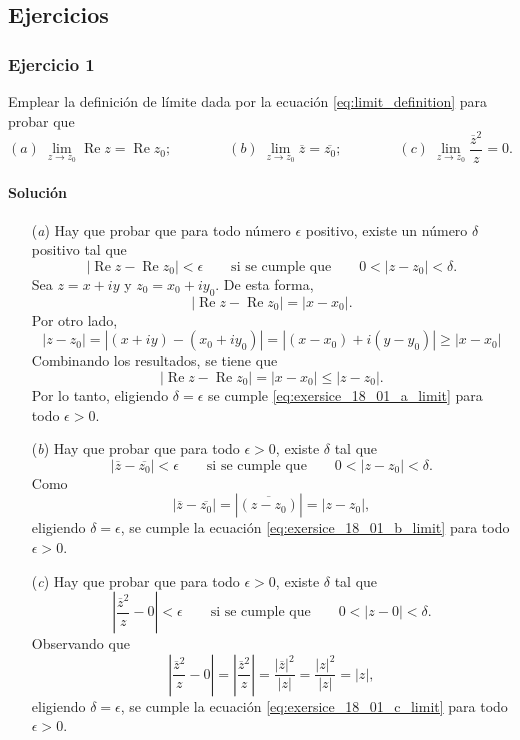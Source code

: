 \documentclass[a4paper]{report}
\renewcommand{\Re}{\operatorname{Re}}
\begin{document}
\subsection*{Ejercicios}

\subsubsection{Ejercicio 1}

Emplear la definición de límite dada por la ecuación \ref{eq:limit_definition} para probar que 
\[
 (\textit{a})\;\lim_{z\to z_0}\Re z=\Re z_0;\qquad\qquad 
 (\textit{b})\;\lim_{z\to z_0}\overline{z}=\overline{z_0};\qquad\qquad
 (\textit{c})\;\lim_{z\to z_0}\frac{\overline{z}^2}{z}=0.
\]

\paragraph{Solución} 
\begin{enumerate}
 \item[(\textit{a})] Hay que probar que para todo número \(\epsilon\) positivo, existe un número \(\delta\) positivo tal que 
\begin{equation}\label{eq:exersice_18_01_a_limit}
 |\Re z-\Re z_0|<\epsilon
 \qquad\textrm{si se cumple que}\qquad
 0<|z-z_0|<\delta.
\end{equation}
Sea \(z=x+iy\) y \(z_0=x_0+iy_0\). De esta forma,
\[
 |\Re z-\Re z_0|=|x-x_0|.
\]
Por otro lado,
\[
 |z-z_0|=|(x+iy)-(x_0+iy_0)|=|(x-x_0)+i(y-y_0)|\geq|x-x_0|
\]
Combinando los resultados, se tiene que 
\[
 |\Re z-\Re z_0|=|x-x_0|\leq|z-z_0|.
\]
Por lo tanto, eligiendo \(\delta=\epsilon\) se cumple \ref{eq:exersice_18_01_a_limit} para todo \(\epsilon>0\).
\item[(\textit{b})] Hay que probar que para todo \(\epsilon>0\), existe \(\delta\) tal que
\begin{equation}\label{eq:exersice_18_01_b_limit}
 |\overline{z}-\overline{z_0}|<\epsilon
 \qquad\textrm{si se cumple que}\qquad
 0<|z-z_0|<\delta.
\end{equation}
Como 
\[
 |\overline{z}-\overline{z_0}|=|\overline{(z-z_0)}|=|z-z_0|,
\]
eligiendo \(\delta=\epsilon\), se cumple la ecuación \ref{eq:exersice_18_01_b_limit} para todo \(\epsilon>0\).
\item[(\textit{c})] Hay que probar que para todo \(\epsilon>0\), existe \(\delta\) tal que
\begin{equation}\label{eq:exersice_18_01_c_limit}
 \left|\frac{\overline{z}^2}{z}-0\right|<\epsilon
 \qquad\textrm{si se cumple que}\qquad
 0<|z-0|<\delta.
\end{equation}
Observando que 
\[
 \left|\frac{\overline{z}^2}{z}-0\right|=\left|\frac{\overline{z}^2}{z}\right|=\frac{|\overline{z}|^2}{|z|}=\frac{|z|^2}{|z|}=|z|,
\]
eligiendo \(\delta=\epsilon\), se cumple la ecuación \ref{eq:exersice_18_01_c_limit} para todo \(\epsilon>0\).
\end{enumerate}
\end{document}
